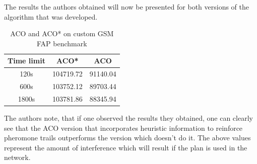 The results the authors obtained will now be presented for both versions of the algorithm that was developed\cite{ACOvsEA}.

\begin{table}
\centering
	\begin{tabular}{| c | c | c |}
	\hline
	Time limit & ACO* & ACO \\ \hline
	120s & 104719.72 & 91140.04 \\ \hline
	600s & 103752.12 & 89703.44 \\ \hline
	1800s & 103781.86 & 88345.94 \\ \hline
	\end{tabular}
\caption{ACO and ACO* on custom GSM FAP benchmark}
\end{table}

The authors note, that if one observed the results they obtained, one can clearly see that the ACO version that incorporates heuristic information to reinforce pheromone trails outperforms the version which doesn't do it\cite{ACOvsEA}. The above values represent the amount of interference which will result if the plan is used in the network\cite{ACOvsEA}.
